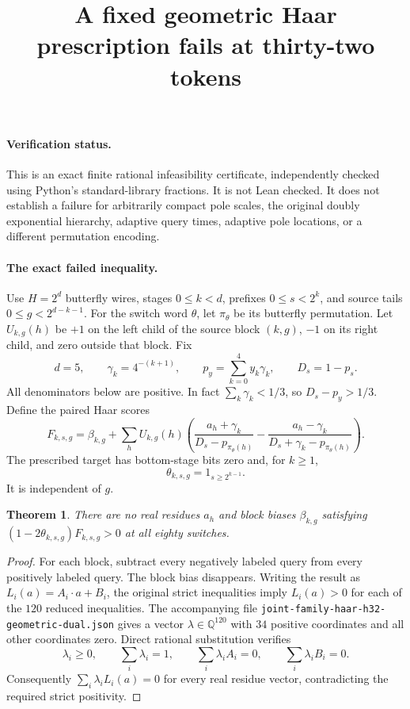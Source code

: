 \documentclass{article}
\newtheorem{theorem}{Theorem}
\begin{document}
\title{A fixed geometric Haar prescription fails at thirty-two tokens}
\maketitle

\paragraph{Verification status.}
This is an exact finite rational infeasibility certificate, independently
checked using Python's standard-library fractions.  It is not Lean
checked.  It does not establish a failure for arbitrarily compact pole
scales, the original doubly exponential hierarchy, adaptive query times,
adaptive pole locations, or a different permutation encoding.

\paragraph{The exact failed inequality.}
Use $H=2^d$ butterfly wires, stages $0\leq k<d$, prefixes
$0\leq s<2^k$, and source tails $0\leq g<2^{d-k-1}$.
For the switch word $\theta$, let $\pi_\theta$ be its butterfly permutation.
Let $U_{k,g}(h)$ be $+1$ on the left child of the source block $(k,g)$,
$-1$ on its right child, and zero outside that block.
Fix
\[
 d=5,\qquad \gamma_k=4^{-(k+1)},\qquad
 p_y=\sum_{k=0}^4 y_k\gamma_k,\qquad D_s=1-p_s.
\]
All denominators below are positive.  In fact
$\sum_k\gamma_k<1/3$, so $D_s-p_y>1/3$.
Define the paired Haar scores
\[
 F_{k,s,g}=\beta_{k,g}+\sum_h U_{k,g}(h)
 \left(\frac{a_h+\gamma_k}{D_s-p_{\pi_\theta(h)}}
 -\frac{a_h-\gamma_k}{D_s+\gamma_k-p_{\pi_\theta(h)}}\right).
\]
The prescribed target has bottom-stage bits zero and, for $k\geq1$,
\[
 \theta_{k,s,g}=1_{s\geq2^{k-1}}.
\]
It is independent of $g$.

\begin{theorem}
There are no real residues $a_h$ and block biases $\beta_{k,g}$ satisfying
$(1-2\theta_{k,s,g})F_{k,s,g}>0$ at all eighty switches.
\end{theorem}
\begin{proof}
For each block, subtract every negatively labeled query from every
positively labeled query.  The block bias disappears.  Writing the
result as $L_i(a)=A_i\cdot a+B_i$, the original strict inequalities imply
$L_i(a)>0$ for each of the $120$ reduced inequalities.
The accompanying file
\texttt{joint-family-haar-h32-geometric-dual.json}
gives a vector $\lambda\in\mathbb Q^{120}$ with $34$ positive coordinates
and all other coordinates zero.  Direct rational substitution verifies
\[
 \lambda_i\geq0,\qquad \sum_i\lambda_i=1,\qquad
 \sum_i\lambda_i A_i=0,\qquad \sum_i\lambda_i B_i=0.
\]
Consequently $\sum_i\lambda_iL_i(a)=0$ for every real residue vector,
contradicting the required strict positivity.
\end{proof}
\end{document}

